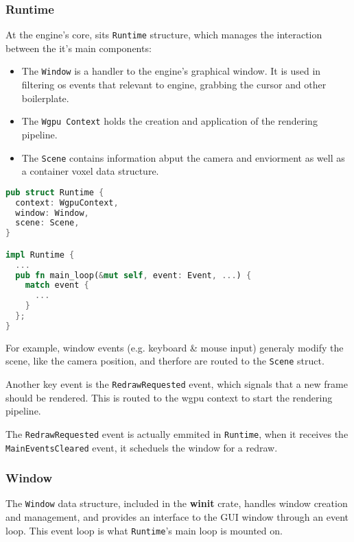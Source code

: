 \subsubsection{Runtime}
\begin{samepage}
At the engine's core, sits \texttt{Runtime}  structure, which manages the interaction between the it's main components:
\begin{itemize}
  \item The \texttt{Window} is a handler to the engine's graphical window. It is used in filtering \acrshort{os} events that relevant to engine, grabbing the cursor and other boilerplate.
  \item The \texttt{Wgpu Context} holds the creation and application of the rendering pipeline.
  \item The \texttt{Scene} contains information abput the camera and enviorment as well as a container voxel data structure.
\end{itemize}
\end{samepage}

\begin{lstlisting}[language=rust,caption={Runtime definition},captionpos=b]
pub struct Runtime {
  context: WgpuContext,
  window: Window,
  scene: Scene,
}

impl Runtime {
  ...
  pub fn main_loop(&mut self, event: Event, ...) {
    match event {
      ...
    }
  };
}
\end{lstlisting}


For example, window events (e.g. keyboard \& mouse input) generaly modify the scene, like the camera position, and therfore are routed to the \verb|Scene| struct.

Another key event is the \verb|RedrawRequested| event, which signals that a new frame should be rendered. This is routed to the wgpu context to start the rendering pipeline.

The \verb|RedrawRequested| event is actually emmited in \verb|Runtime|, when it receives the \verb|MainEventsCleared| event, it scheduels the window for a redraw.

\subsubsection{Window}
The \verb|Window| data structure, included in the \textbf{winit}\supercite{winit:doc} crate, handles window creation and management, and provides an interface to the GUI window through an event loop. This event loop is what \verb|Runtime|'s main loop is mounted on.

